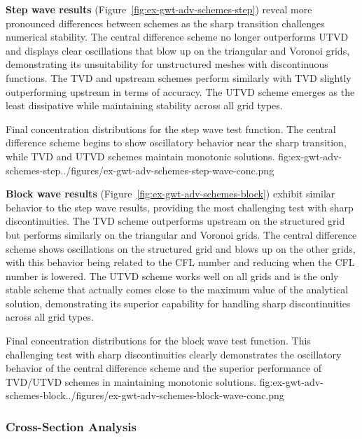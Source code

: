 \textbf{Step wave results} (Figure~\ref{fig:ex-gwt-adv-schemes-step}) reveal more pronounced differences between schemes as the sharp transition challenges numerical stability. The central difference scheme no longer outperforms UTVD and displays clear oscillations that blow up on the triangular and Voronoi grids, demonstrating its unsuitability for unstructured meshes with discontinuous functions. The TVD and upstream schemes perform similarly with TVD slightly outperforming upstream in terms of accuracy. The UTVD scheme emerges as the least dissipative while maintaining stability across all grid types.
\begin{StandardFigure}{
    Final concentration distributions for the step wave test function. The central difference scheme begins to show oscillatory behavior near the sharp transition, while TVD and UTVD schemes maintain monotonic solutions.
}{fig:ex-gwt-adv-schemes-step}{../figures/ex-gwt-adv-schemes-step-wave-conc.png}
\end{StandardFigure}

\textbf{Block wave results} (Figure~\ref{fig:ex-gwt-adv-schemes-block}) exhibit similar behavior to the step wave results, providing the most challenging test with sharp discontinuities. The TVD scheme outperforms upstream on the structured grid but performs similarly on the triangular and Voronoi grids. The central difference scheme shows oscillations on the structured grid and blows up on the other grids, with this behavior being related to the CFL number and reducing when the CFL number is lowered. The UTVD scheme works well on all grids and is the only stable scheme that actually comes close to the maximum value of the analytical solution, demonstrating its superior capability for handling sharp discontinuities across all grid types.
\begin{StandardFigure}{
    Final concentration distributions for the block wave test function. This challenging test with sharp discontinuities clearly demonstrates the oscillatory behavior of the central difference scheme and the superior performance of TVD/UTVD schemes in maintaining monotonic solutions.
}{fig:ex-gwt-adv-schemes-block}{../figures/ex-gwt-adv-schemes-block-wave-conc.png}
\end{StandardFigure}

\subsubsection{Cross-Section Analysis}

